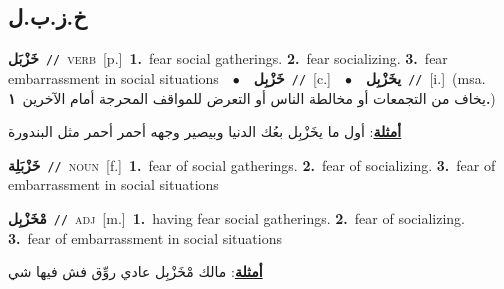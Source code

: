 \documentclass[10pt,a4paper,twoside]{article} %
\begin{document}
\begin{multicols}{2}
\vspace{-3mm}
\subsection*{\color{blue}\foreignlanguage{arabic}{خ.ز.ب.ل}\color{blue}{}} 

{\setlength\topsep{0pt}\textbf{\foreignlanguage{arabic}{خَزْبَل}}\ {\color{gray}\texttt{//}\color{black}}\ \textsc{verb}\ [p.]\ \textbf{1.}~fear social gatherings.  \textbf{2.}~fear socializing.  \textbf{3.}~fear embarrassment in social situations\ \ $\bullet$\ \ \setlength\topsep{0pt}\textbf{\foreignlanguage{arabic}{خَزْبِل}}\ {\color{gray}\texttt{//}\color{black}}\ [c.]\ \ $\bullet$\ \ \setlength\topsep{0pt}\textbf{\foreignlanguage{arabic}{يخَزْبِل}}\ {\color{gray}\texttt{//}\color{black}}\ [i.]\ \color{gray}(msa. \foreignlanguage{arabic}{يخاف من التجمعات أو مخالطة الناس أو التعرض للمواقف المحرجة أمام الآخرين}~\foreignlanguage{arabic}{\textbf{١.}})\color{black}\  \begin{flushright}\color{gray}\foreignlanguage{arabic}{\textbf{\underline{\foreignlanguage{arabic}{أمثلة}}}: أول ما يخَزْبِل بعُك الدنيا وبيصير وجهه أحمر أحمر مثل البندورة}\end{flushright}\color{black}} \vspace{2mm}

{\setlength\topsep{0pt}\textbf{\foreignlanguage{arabic}{خَزْبَلِة}}\ {\color{gray}\texttt{//}\color{black}}\ \textsc{noun}\ [f.]\ \textbf{1.}~fear of social gatherings.  \textbf{2.}~fear of socializing.  \textbf{3.}~fear of embarrassment in social situations\ } \vspace{2mm}

{\setlength\topsep{0pt}\textbf{\foreignlanguage{arabic}{مْخَزْبِل}}\ {\color{gray}\texttt{//}\color{black}}\ \textsc{adj}\ [m.]\ \textbf{1.}~having fear social gatherings.  \textbf{2.}~fear of socializing.  \textbf{3.}~fear of embarrassment in social situations\  \begin{flushright}\color{gray}\foreignlanguage{arabic}{\textbf{\underline{\foreignlanguage{arabic}{أمثلة}}}: مالك مْخَزْبِل عادي روِّق فش فيها شي}\end{flushright}\color{black}} \vspace{2mm}


\end{multicols}
\end{document}

